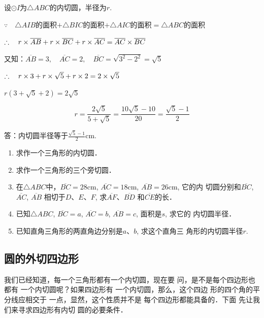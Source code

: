   \begin{solution}
    设$\odot I$为$\triangle ABC$的内切圆，半径为$r$.
  
  $\because\quad \triangle AIB$的面积$+\triangle BIC$的面积$+\triangle AIC$的面积$=\triangle ABC$的面积
  
  $\therefore\quad r\times \overline{AB}+r\times \overline{BC}+r\times \overline{AC}=\overline{AC}\times \overline{BC}$
  
  又知：$\overline{AB}=3,\quad \overline{AC}=2,\quad \overline{BC}=\sqrt{3^2-2^2}=\sqrt{5}$
  
  $\therefore\quad r\times 3+r\times \sqrt{5}+r\times 2=2\times \sqrt{5}$

  $r(3+\sqrt{5}+2)=2\sqrt{5}$

  \[r=\frac{2\sqrt{5}}{5+\sqrt{5}}=\frac{10\sqrt{5}-10}{20}=\frac{\sqrt{5}-1}{2}\]
  
  答：内切圆半径等于$\frac{\sqrt{5}-1}{2}$cm.
  \end{solution}

\begin{ex}
\begin{enumerate}
    \item 求作一个三角形的内切圆．
    \item 求作一个三角形的三个旁切圆．
    \item 在$\triangle ABC$中，$\overline{BC}=28$cm, $\overline{AC}=18$cm, $\overline{AB}=26$cm, 它的内
    切圆分别和$\overline{BC}$, $\overline{AC}$, $\overline{AB}$
    相切于$D$、$E$、$F$, 求$\overline{AF}$、$\overline{BD}$
    和$\overline{CE}$的长．
    \item 已知$\triangle ABC$, $\overline{BC}=a$, $\overline{AC}=b$, $\overline{AB}=c$, 面积是$s$, 求它的
    内切圆半径．
    \item 已知直角三角形的两直角边分别是$a$、$b$, 求这个直角三
    角形的内切圆半径$r$.
\end{enumerate}
\end{ex}

\subsection{圆的外切四边形}

我们已经知道，每一个三角形都有一个内切圆，现在要
问，是不是每个四边形也都有
一个内切圆呢？如果四边形有
一个内切圆，那么，这个四边
形的四个角的平分线应相交于
一点，显然，这个性质并不是
每个四边形都能具备的．下面
先让我们来寻求四边形有内切
圆的必要条件．

